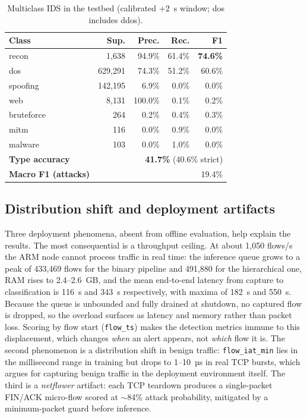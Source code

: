 \documentclass[conference]{IEEEtran}
\begin{document}
\begin{table}[t]
\centering
\caption{Multiclass IDS in the testbed (calibrated $+2$~s window; dos includes ddos).}
\label{tab:multi_metrics}
\footnotesize
\setlength{\tabcolsep}{3.5pt}
\begin{tabular}{@{}lrrrr@{}}
\toprule
\textbf{Class} & \textbf{Sup.} & \textbf{Prec.} & \textbf{Rec.} & \textbf{F1} \\ \midrule
recon      &   1{,}638 & 94.9\% & 61.4\% & \textbf{74.6\%} \\
dos        & 629{,}291 & 74.3\% & 51.2\% & 60.6\% \\
spoofing   & 142{,}195 &  6.9\% &  0.0\% & 0.0\% \\
web        &   8{,}131 & 100.0\% &  0.1\% & 0.2\% \\
bruteforce &      264 &  0.2\% &  0.4\% & 0.3\% \\
mitm       &      116 &  0.0\% &  0.9\% & 0.0\% \\
malware    &      103 &  0.0\% &  1.0\% & 0.0\% \\ \midrule
\textbf{Type accuracy} & \multicolumn{4}{r}{\textbf{41.7\%} (40.6\% strict)} \\
\textbf{Macro F1 (attacks)} & \multicolumn{4}{r}{19.4\%} \\
\bottomrule
\end{tabular}
\end{table}



\subsection{Distribution shift and deployment artifacts}
\label{subsec:res_artifacts}

Three deployment phenomena, absent from offline evaluation, help explain the results. The most consequential is a throughput ceiling. At about 1{,}050 flows/s the ARM node cannot process traffic in real time: the inference queue grows to a peak of 433{,}469 flows for the binary pipeline and 491{,}880 for the hierarchical one, RAM rises to 2.4--2.6~GB, and the mean end-to-end latency from capture to classification is 116~s and 343~s respectively, with maxima of 182~s and 550~s. Because the queue is unbounded and fully drained at shutdown, no captured flow is dropped, so the overload surfaces as latency and memory rather than packet loss. Scoring by flow start (\texttt{flow\_ts}) makes the detection metrics immune to this displacement, which changes \emph{when} an alert appears, not \emph{which} flow it is. The second phenomenon is a distribution shift in benign traffic: \texttt{flow\_iat\_min} lies in the millisecond range in training but drops to 1--10~µs in real TCP bursts, which argues for capturing benign traffic in the deployment environment itself. The third is a \textit{netflower} artifact: each TCP teardown produces a single-packet FIN/ACK micro-flow scored at $\sim$84\% attack probability, mitigated by a minimum-packet guard before inference.
\end{document}
